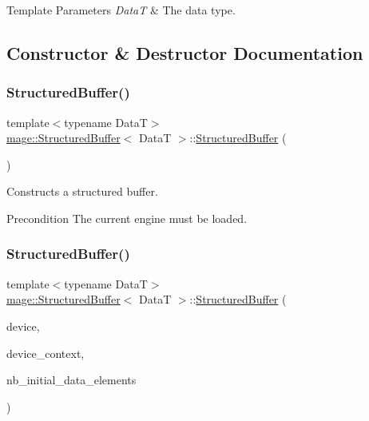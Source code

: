 \begin{DoxyTemplParams}{Template Parameters}
{\em DataT} & The data type. \\
\hline
\end{DoxyTemplParams}


\subsection{Constructor \& Destructor Documentation}
\hypertarget{structmage_1_1_structured_buffer_a621e2b92cf91e50d3639680a716eb0c6}{}\label{structmage_1_1_structured_buffer_a621e2b92cf91e50d3639680a716eb0c6} 
\subsubsection{\texorpdfstring{Structured\+Buffer()}{StructuredBuffer()}\hspace{0.1cm}{\footnotesize\ttfamily [1/4]}}
{\footnotesize\ttfamily template$<$typename DataT$>$ \\
\hyperlink{structmage_1_1_structured_buffer}{mage\+::\+Structured\+Buffer}$<$ DataT $>$\+::\hyperlink{structmage_1_1_structured_buffer}{Structured\+Buffer} (\begin{DoxyParamCaption}{ }\end{DoxyParamCaption})}

Constructs a structured buffer.

\begin{DoxyPrecond}{Precondition}
The current engine must be loaded. 
\end{DoxyPrecond}
\hypertarget{structmage_1_1_structured_buffer_a9ba747c0666b96c17e3711266ee74aa0}{}\label{structmage_1_1_structured_buffer_a9ba747c0666b96c17e3711266ee74aa0} 
\subsubsection{\texorpdfstring{Structured\+Buffer()}{StructuredBuffer()}\hspace{0.1cm}{\footnotesize\ttfamily [2/4]}}
{\footnotesize\ttfamily template$<$typename DataT$>$ \\
\hyperlink{structmage_1_1_structured_buffer}{mage\+::\+Structured\+Buffer}$<$ DataT $>$\+::\hyperlink{structmage_1_1_structured_buffer}{Structured\+Buffer} (\begin{DoxyParamCaption}\item[{I\+D3\+D11\+Device2 $\ast$}]{device,  }\item[{I\+D3\+D11\+Device\+Context2 $\ast$}]{device\+\_\+context,  }\item[{size\+\_\+t}]{nb\+\_\+initial\+\_\+data\+\_\+elements }\end{DoxyParamCaption})\hspace{0.3cm}{\ttfamily [explicit]}}

